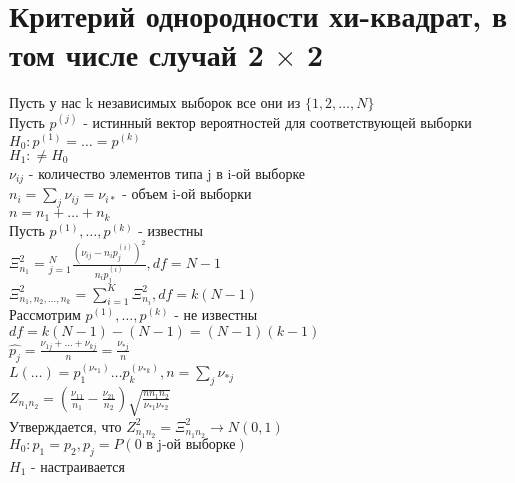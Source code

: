 \documentclass{article}
\newcommand\0{\mathbb{0}}
\newcommand\1{\mathbb{1}}
\begin{document}
\section{Критерий однородности хи-квадрат, в том числе случай 2 $\times$ 2}
Пусть у нас k независимых выборок все они из $\{1, 2, \dots, N\}$\\
Пусть $p^{(j)}$ - истинный вектор вероятностей для соответствующей выборки\\
$H_0: p^{(1)} = \dots = p^{(k)}$\\
$H_1: \neq H_0$\\
$\nu_{ij}$ - количество элементов типа j в i-ой выборке\\
$n_i = \displaystyle\sum_j \nu_{ij} = \nu_{i*}$ - объем i-ой выборки\\
$n = n_1 + \dots + n_k$\\
Пусть $p^{(1)}, \dots, p^{(k)}$ - известны\\
$\Xi_{n_1}^2 = \displaystyle_{j = 1}^N \frac{(\nu_{ij} - n_i p_j^{(i)})^2}{n_i p_j^(i)}, df = N - 1$\\
$\Xi^2_{n_1, n_2, \dots, n_k} = \displaystyle\sum_{i = 1}^K \Xi_{n_i}^2, df = k(N - 1)$\\
Рассмотрим $p^{(1)}, \dots, p^{(k)}$ - не известны\\
$df = k(N - 1) - (N - 1) = (N - 1)(k - 1)$\\
$\widehat{p_{j}} = \frac{\nu_{1j} + \dots + \nu_{kj}}{n} = \frac{\nu_{*j}}{n}$\\
$L(\dots) = p_1^{(\nu_{*1})} \dots p_k^{(\nu_{*k})}, n = \displaystyle\sum_j \nu_{*j}$\\
$Z_{n_1n_2} = (\frac{\nu_{11}}{n_1} - \frac{\nu_{21}}{n_2})\sqrt{\frac{nn_1n_2}{\nu_{*1}\nu_{*2}}}$\\
Утверждается, что $Z_{n_1n_2}^2 = \Xi_{n_1n_2}^2 \to N(0, 1)$\\
$H_0: p_1 = p_2, p_j = P(\text{0 в j-ой выборке})$\\
$H_1$ - настраивается
\end{document}
